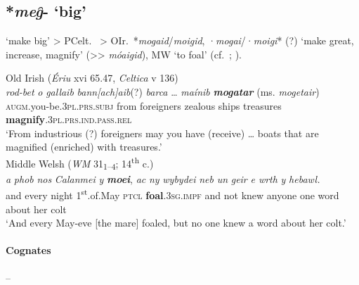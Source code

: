 \documentclass[output=paper,colorlinks,citecolor=brown]{langscibook}
\begin{document}
\subsection{*\textit{meg̑}- ‘big’}
\label{sec:Causbig}

 ‘make big’ > PCelt.\  > OIr.\ *\textit{mogaid}/\textit{moigid}, ·\textit{mogai}/·\textit{moigi}* (?)  ‘make great, increase, magnify’ (>{>} \textit{móaigid}), MW  ‘to foal’ (cf.\ \citealt[136]{Joseph1987}; \citealt[469]{Schumacher2004}).

\begin{exe}
    \ex Old Irish (\textit{Ériu} xvi 65.47, \textit{Celtica} v 136) \label{ex:Causbig1}\\
        \gll \textit{rod-bet} \textit{o} \textit{gallaib} \textit{bann[ach]aib}(?) \textit{barca} … \textit{maínib} \textbf{\textit{mogatar}}  ({ms.} \textit{mogetair})  \\
        \textsc{augm}.you-be.\textsc{3pl.prs.subj} from foreigners zealous ships {} treasures \textbf{magnify}.\textsc{3pl.prs.ind.pass.rel}\\
        \glt ‘From industrious (?) foreigners may you have (receive) … boats that are magnified (enriched) with treasures.’\\
    \ex Middle Welsh (\textit{WM} 31\textsubscript{1--4}; 14\textsuperscript{th} c.) \label{ex:Causbig2}\\
        \gll \textit{a} \textit{phob} \textit{nos} \textit{Calanmei} \textit{y} {\textbf{\textit{moei}}, } \textit{ac} \textit{ny} \textit{wybydei} \textit{neb} \textit{un} \textit{geir} \textit{e wrth} \textit{y} \textit{hebawl.} \\
        and every night 1\textsuperscript{st}.of.May \textsc{ptcl} \textbf{foal}.\textsc{3sg.impf} and not knew anyone one word about her colt \\
        \glt ‘And every May-eve [the mare] foaled, but no one knew a word about her colt.’\\
\end{exe}

\paragraph*{Cognates}  -- 
\end{document}
